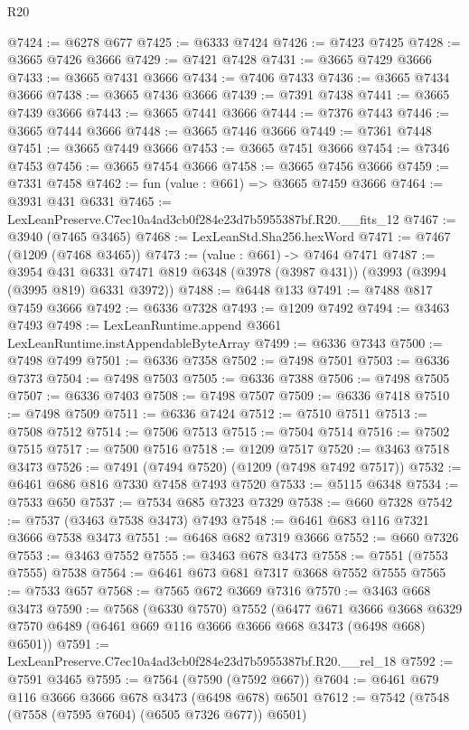 \begin{lexlean}{R20}
\begin{coremodule}
@7424 := @6278 @677
@7425 := @6333 @7424
@7426 := @7423 @7425
@7428 := @3665 @7426 @3666
@7429 := @7421 @7428
@7431 := @3665 @7429 @3666
@7433 := @3665 @7431 @3666
@7434 := @7406 @7433
@7436 := @3665 @7434 @3666
@7438 := @3665 @7436 @3666
@7439 := @7391 @7438
@7441 := @3665 @7439 @3666
@7443 := @3665 @7441 @3666
@7444 := @7376 @7443
@7446 := @3665 @7444 @3666
@7448 := @3665 @7446 @3666
@7449 := @7361 @7448
@7451 := @3665 @7449 @3666
@7453 := @3665 @7451 @3666
@7454 := @7346 @7453
@7456 := @3665 @7454 @3666
@7458 := @3665 @7456 @3666
@7459 := @7331 @7458
@7462 := fun (value : @661) => @3665 @7459 @3666
@7464 := @3931 @431 @6331
@7465 := LexLeanPreserve.C7ec10a4ad3cb0f284e23d7b5955387bf.R20.__fits_12
@7467 := @3940 (@7465 @3465)
@7468 := LexLeanStd.Sha256.hexWord
@7471 := @7467 (@1209 (@7468 @3465))
@7473 := (value : @661) -> @7464 @7471
@7487 := @3954
    @431
    @6331
    @7471
    @819
    @6348
    (@3978 (@3987 @431))
    (@3993 (@3994 (@3995 @819) @6331 @3972))
@7488 := @6448 @133
@7491 := @7488 @817 @7459 @3666
@7492 := @6336 @7328
@7493 := @1209 @7492
@7494 := @3463 @7493
@7498 := LexLeanRuntime.append @3661 LexLeanRuntime.instAppendableByteArray
@7499 := @6336 @7343
@7500 := @7498 @7499
@7501 := @6336 @7358
@7502 := @7498 @7501
@7503 := @6336 @7373
@7504 := @7498 @7503
@7505 := @6336 @7388
@7506 := @7498 @7505
@7507 := @6336 @7403
@7508 := @7498 @7507
@7509 := @6336 @7418
@7510 := @7498 @7509
@7511 := @6336 @7424
@7512 := @7510 @7511
@7513 := @7508 @7512
@7514 := @7506 @7513
@7515 := @7504 @7514
@7516 := @7502 @7515
@7517 := @7500 @7516
@7518 := @1209 @7517
@7520 := @3463 @7518 @3473
@7526 := @7491 (@7494 @7520) (@1209 (@7498 @7492 @7517))
@7532 := @6461 @686 @816 @7330 @7458 @7493 @7520
@7533 := @5115 @6348
@7534 := @7533 @650
@7537 := @7534 @685 @7323 @7329
@7538 := @660 @7328
@7542 := @7537 (@3463 @7538 @3473) @7493
@7548 := @6461 @683 @116 @7321 @3666 @7538 @3473
@7551 := @6468 @682 @7319 @3666
@7552 := @660 @7326
@7553 := @3463 @7552
@7555 := @3463 @678 @3473
@7558 := @7551 (@7553 @7555) @7538
@7564 := @6461 @673 @681 @7317 @3668 @7552 @7555
@7565 := @7533 @657
@7568 := @7565 @672 @3669 @7316
@7570 := @3463 @668 @3473
@7590 := @7568
    (@6330 @7570)
    @7552
    (@6477
      @671
      @3666
      @3668
      @6329
      @7570
      @6489
      (@6461 @669 @116 @3666 @3666 @668 @3473 (@6498 @668) @6501))
@7591 := LexLeanPreserve.C7ec10a4ad3cb0f284e23d7b5955387bf.R20.__rel_18
@7592 := @7591 @3465
@7595 := @7564 (@7590 (@7592 @667))
@7604 := @6461 @679 @116 @3666 @3666 @678 @3473 (@6498 @678) @6501
@7612 := @7542 (@7548 (@7558 (@7595 @7604) (@6505 @7326 @677)) @6501)

\end{coremodule}
\end{lexlean}
